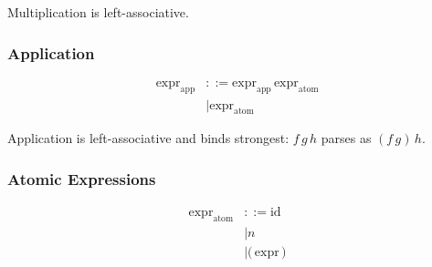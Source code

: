 \documentclass[12pt]{article}
\begin{document}
Multiplication is left-associative.

\subsubsection{Application}

\begin{align*}
\text{expr}_{\text{app}} &::= \text{expr}_{\text{app}} \, \text{expr}_{\text{atom}} \\
                         &\mid \text{expr}_{\text{atom}}
\end{align*}

Application is left-associative and binds strongest: $f \, g \, h$ parses as $(f \, g) \, h$.

\subsubsection{Atomic Expressions}

\begin{align*}
\text{expr}_{\text{atom}} &::= \text{id} \\
                          &\mid n \\
                          &\mid \textbf{(} \, \text{expr} \, \textbf{)}
\end{align*}
\end{document}
